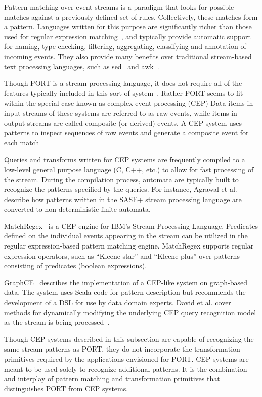 Pattern matching
over event streams is a paradigm
that looks for
possible matches against a previously defined set of rules. Collectively, these matches form a pattern.
Languages written for this purpose are significantly richer than those used for regular expression
matching~\cite{DBLP:conf/sigmod/AgrawalDGI08},
and typically provide automatic
support for naming, type checking, filtering, aggregating, classifying and
annotation of incoming events. They also  provide many benefits over traditional
stream-based text processing languages, such as sed~\cite{Mcmahon1979sed} and
awk~\cite{DBLP:journals/spe/AhoKW79}.

Though PORT is a stream processing language, it does not
require all of the features typically
included in this sort of system~\cite{DBLP:journals/csur/DayarathnaP18}.
Rather PORT seems to fit within the special case
known as complex event processing (CEP) 
Data items in input streams of these systems are referred to as raw events, while items in output streams are called
composite (or derived) events. A CEP system uses patterns to inspect
sequences of raw events and generate a composite event for each
match~\cite{DBLP:journals/ibmrd/HirzelAGJKKMNSSW13}

Queries and transforms written for CEP systems are
frequently compiled to a low-level general purpose language (C, C++, etc.) to allow for fast
processing of the stream. During the compilation process, automata are typically
built to recognize the patterns specified by the queries. For instance, Agrawal et
al.~\cite{DBLP:conf/sigmod/AgrawalDGI08} describe how patterns written in the SASE+ stream
processing language are converted to non-deterministic finite automata. 

MatchRegex~\cite{DBLP:conf/debs/Hirzel12} is a CEP engine for IBM’s Stream Processing
Language. Predicates defined on the individual events appearing in the
stream can be utilized in the regular expression-based pattern matching
engine. MatchRegex supports regular expression operators, such as “Kleene star”
and “Kleene plus” over patterns consisting of predicates (boolean expressions).

GraphCE~\cite{DBLP:conf/models/BarqueroBTV18} describes the implementation of a CEP-like system on graph-based data. The system uses Scala code for pattern description but recommends the development of a DSL for use by data domain experts.
David et al. cover methods for dynamically modifying the underlying CEP query recognition model as the stream is being processed~\cite{DBLP:journals/sosym/DavidRV18}.

Though CEP systems described in this subsection are capable
of recognizing the same stream patterns as PORT, they
do not incorporate the
transformation primitives 
required by the applications
envisioned for PORT. CEP systems are meant
to be used solely to recognize additional patterns.
It is the combination and interplay of pattern matching and transformation
primitives that distinguishes PORT from CEP systems.



